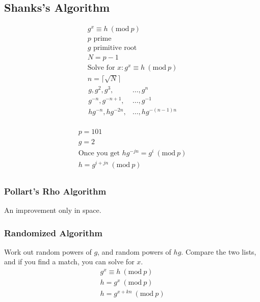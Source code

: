 \documentclass{article}
\newcommand{\Mod}[1]{\ (\mathrm{mod}\ #1)}
\begin{document}
\begin{multicols*}{2}
    \subsection*{Shanks's Algorithm}
    \begin{multicols*}{2}
        \begin{align*}
            g^x \equiv h \Mod{p}                      \\
            p \text{ prime}                           \\
            g \text{ primitive root}                  \\
            N = p - 1                                 \\
            \text{Solve for } x: g^x \equiv h \Mod{p} \\[1em]
            n = \lceil \sqrt{N} \rceil
        \end{align*}
        \columnbreak
        \begin{align*} g, g^2, g^3,       & \ldots, g^n          \\
               g^{-n}, g^{-n+1},  & \ldots, g^{-1}       \\
               hg^{-n}, hg^{-2n}, & \ldots, hg^{-(n-1)n} \\
        \end{align*}
    \end{multicols*}
    \vspace*{-8em}
    \begin{align*}
        p = 101                                     \\
        g = 2                                       \\
        \text{Once you get } hg^{-jn} = g^i \Mod{p} \\
        h = g^{i + jn} \Mod{p}                      \\
    \end{align*}
    \subsubsection*{Pollart's Rho Algorithm}
    An improvement only in space.
    \subsubsection*{Randomized Algorithm}
    Work out random powers of \(g\), and random powers of \(hg\).
    Compare the two lists, and if you find a match, you can solve for \(x\).
    \begin{align*}
        g^x \equiv h \Mod{p} \\
        h = g^x \Mod{p}      \\
        h = g^{x + kn} \Mod{p}
    \end{align*}
\end{multicols*}
\end{document}
